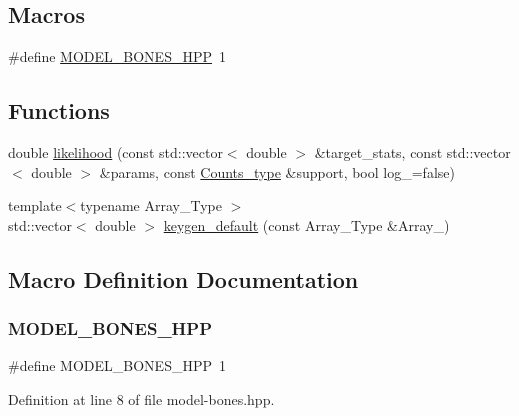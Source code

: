 \subsection*{Macros}
\begin{DoxyCompactItemize}
\item 
\#define \hyperlink{model-bones_8hpp_a96ab9fc3cc62974a71e056d8d86a83e1}{M\+O\+D\+E\+L\+\_\+\+B\+O\+N\+E\+S\+\_\+\+H\+PP}~1
\end{DoxyCompactItemize}
\subsection*{Functions}
\begin{DoxyCompactItemize}
\item 
double \hyperlink{model-bones_8hpp_a0fa8078cca870ae78006afe2fe147717}{likelihood} (const std\+::vector$<$ double $>$ \&target\+\_\+stats, const std\+::vector$<$ double $>$ \&params, const \hyperlink{typedefs_8hpp_aee40fa17c1fddb63dd1f2b1470ade95b}{Counts\+\_\+type} \&support, bool log\+\_\+=false)
\item 
{\footnotesize template$<$typename Array\+\_\+\+Type $>$ }\\std\+::vector$<$ double $>$ \hyperlink{model-bones_8hpp_ac8a92bc92bfb721602c0470f3efa4f84}{keygen\+\_\+default} (const Array\+\_\+\+Type \&Array\+\_\+)
\end{DoxyCompactItemize}


\subsection{Macro Definition Documentation}
\mbox{\label{model-bones_8hpp_a96ab9fc3cc62974a71e056d8d86a83e1}} 
\subsubsection{\texorpdfstring{M\+O\+D\+E\+L\+\_\+\+B\+O\+N\+E\+S\+\_\+\+H\+PP}{MODEL\_BONES\_HPP}}
{\footnotesize\ttfamily \#define M\+O\+D\+E\+L\+\_\+\+B\+O\+N\+E\+S\+\_\+\+H\+PP~1}



Definition at line 8 of file model-\/bones.\+hpp.



